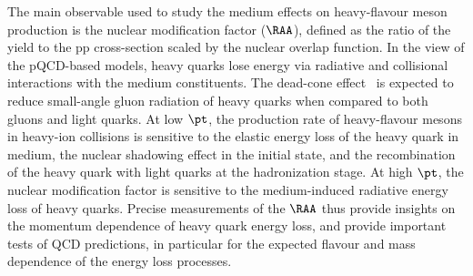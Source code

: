 


The main observable used to study the medium effects on heavy-flavour meson production is the nuclear modification factor ($\RAA$), defined as the ratio of the \PbPb yield to the pp cross-section scaled by the nuclear overlap function. In the view of the pQCD-based models, heavy quarks lose energy via radiative and collisional interactions with the medium constituents. The dead-cone effect~\cite{DOKSHITZER2001199} is expected to reduce small-angle gluon radiation of heavy quarks when compared to both gluons and light quarks. At low $\pt$, the production rate of heavy-flavour mesons in heavy-ion collisions is sensitive to the elastic energy loss of the heavy quark in medium, the nuclear shadowing effect in the initial state, and the recombination of the heavy quark with light quarks at the hadronization stage. At high $\pt$, the nuclear modification factor is sensitive to the medium-induced radiative energy loss of heavy quarks. Precise measurements of the $\RAA$ thus provide insights on the momentum dependence of heavy quark energy loss, and provide important tests of QCD predictions, in particular for the expected flavour and mass dependence of the energy loss processes.

